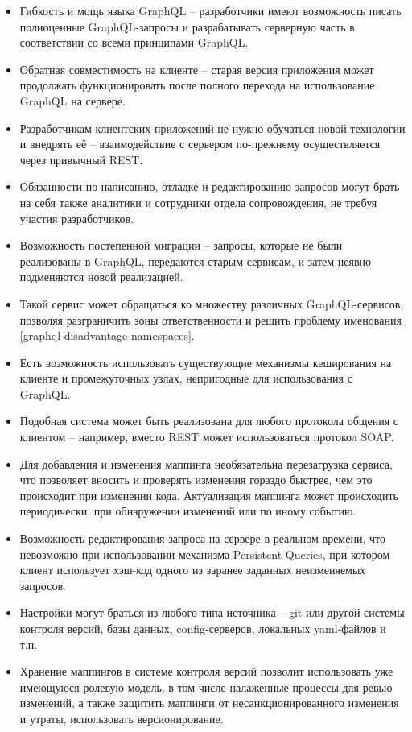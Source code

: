 \begin{itemize}
    \item Гибкость и мощь языка GraphQL – разработчики имеют возможность писать полноценные GraphQL-запросы и разрабатывать серверную часть в соответствии со всеми принципами GraphQL\@.
    \item Обратная совместимость на клиенте – старая версия приложения может продолжать функционировать после полного перехода на использование GraphQL на сервере.
    \item Разработчикам клиентских приложений не нужно обучаться новой технологии и внедрять её – взаимодействие с сервером по-прежнему осуществляется через привычный REST\@.
    \item Обязанности по написанию, отладке и редактированию запросов могут брать на себя также аналитики и сотрудники отдела сопровождения, не требуя участия разработчиков.
    \item Возможность постепенной миграции – запросы, которые не были реализованы в GraphQL, передаются старым сервисам, и затем неявно подменяются новой реализацией.
    \item Такой сервис может обращаться ко множеству различных GraphQL-сервисов, позволяя разграничить зоны ответственности и решить проблему именования \ref{graphql-disadvantage-namespaces}.
    \item Есть возможность использовать существующие механизмы кеширования на клиенте и промежуточных узлах, непригодные для использования с GraphQL\@.
    \item Подобная система может быть реализована для любого протокола общения с клиентом – например, вместо REST может использоваться протокол SOAP\@.
    \item Для добавления и изменения маппинга необязательна перезагрузка сервиса, что позволяет вносить и проверять изменения гораздо быстрее, чем это происходит при изменении кода.
    Актуализация маппинга может происходить периодически, при обнаружении изменений или по иному событию.
    \item Возможность редактирования запроса на сервере в реальном времени, что невозможно при использовании механизма Persistent Queries, при котором клиент использует хэш-код одного из заранее заданных неизменяемых запросов.
    \item Настройки могут браться из любого типа источника – git или другой системы контроля версий, базы данных, config-серверов, локальных yaml-файлов и т.п.
    \item Хранение маппингов в системе контроля версий позволит использовать уже имеющуюся ролевую модель, в том числе налаженные процессы для ревью изменений, а также защитить маппинги от несанкционированного изменения и утраты, использовать версионирование.

\end{itemize}
